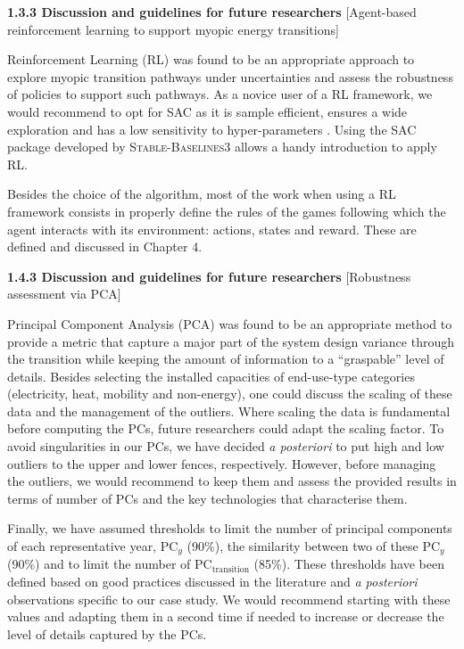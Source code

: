 \documentclass[12pt,a4paper]{article}
\begin{document}
\begin{mdframed}[style=manuscript]
\textbf{1.3.3 Discussion and guidelines for future researchers} [Agent-based reinforcement learning to support myopic energy transitions]

Reinforcement Learning (RL) was found to be an appropriate approach to explore myopic transition pathways under uncertainties and assess the robustness of policies to support such pathways. As a novice user of a RL framework, we would recommend to opt for SAC as it is sample efficient, ensures a wide exploration and has a low sensitivity to hyper-parameters \cite{haarnoja2018soft}. Using the SAC package developed by \textsc{Stable-Baselines3} allows a handy introduction to apply RL. 

Besides the choice of the algorithm, most of the work when using a RL framework consists in properly define the rules of the games following which the agent interacts with its environment: actions, states and reward. These are defined and discussed in Chapter 4.
\end{mdframed}

\begin{mdframed}[style=manuscript]
\textbf{1.4.3 Discussion and guidelines for future researchers} [Robustness assessment via PCA]

Principal Component Analysis (PCA) was found to be an appropriate method to provide a metric that capture a major part of the system design variance through the transition while keeping the amount of information to a ``graspable'' level of details. Besides selecting the installed capacities of end-use-type categories (electricity, heat, mobility and non-energy), one could discuss the scaling of these data and the management of the outliers. Where scaling the data is fundamental before computing the PCs, future researchers could adapt the scaling factor. To avoid singularities in our PCs, we have decided \textit{a posteriori} to put high and low outliers to the upper and lower fences, respectively. However, before managing the outliers, we would recommend to keep them and assess the provided results in terms of number of PCs and the key technologies that characterise them.

Finally, we have assumed thresholds to limit the number of principal components of each representative year, $\text{PC}_y$ (90\%), the similarity between two of these $\text{PC}_y$ (90\%) and to limit the number of $\text{PC}_{\text{transition}}$ (85\%). These thresholds have been defined based on good practices discussed in the literature and \textit{a posteriori} observations specific to our case study. We would recommend starting with these values and adapting them in a second time if needed to increase or decrease the level of details captured by the PCs.
\end{mdframed}
\end{document}
